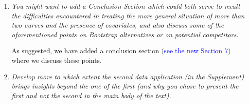 \documentclass[a4paper,12pt]{article}
\begin{document}
\begin{enumerate}[label=\arabic*.,leftmargin=0.6cm]



\item \textit{You might want to add a Conclusion Section which could both serve to recall the difficulties encountered in treating the more general situation of more than two curves and the presence of
covariates, and also discuss some of the aforementioned points on Bootstrap alternatives or on potential competitors.}  

As suggested, we have added a conclusion section (\textcolor{blue}{see the new Section 7}) where we discuss these points. 


\item \textit{Develop more to which extent the second data application (in the Supplement) brings insights beyond the one of the first (and why you chose to present the first and not the second in the main body of the text).}


\end{enumerate}
\end{document}

